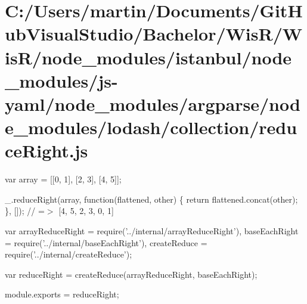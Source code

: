 \hypertarget{_c_1_2_users_2martin_2_documents_2_git_hub_visual_studio_2_bachelor_2_wis_r_2_wis_r_2node_module671f51f951fa4dfb41949ac0f2c99054}{}\section{C\+:/\+Users/martin/\+Documents/\+Git\+Hub\+Visual\+Studio/\+Bachelor/\+Wis\+R/\+Wis\+R/node\+\_\+modules/istanbul/node\+\_\+modules/js-\/yaml/node\+\_\+modules/argparse/node\+\_\+modules/lodash/collection/reduce\+Right.\+js}
var array = \mbox{[}\mbox{[}0, 1\mbox{]}, \mbox{[}2, 3\mbox{]}, \mbox{[}4, 5\mbox{]}\mbox{]};

\+\_\+.\+reduce\+Right(array, function(flattened, other) \{ return flattened.\+concat(other); \}, \mbox{[}\mbox{]}); // =$>$ \mbox{[}4, 5, 2, 3, 0, 1\mbox{]}


\begin{DoxyCodeInclude}
var arrayReduceRight = require(\textcolor{stringliteral}{'../internal/arrayReduceRight'}),
    baseEachRight = require(\textcolor{stringliteral}{'../internal/baseEachRight'}),
    createReduce = require(\textcolor{stringliteral}{'../internal/createReduce'});

var reduceRight = createReduce(arrayReduceRight, baseEachRight);

module.exports = reduceRight;
\end{DoxyCodeInclude}
 